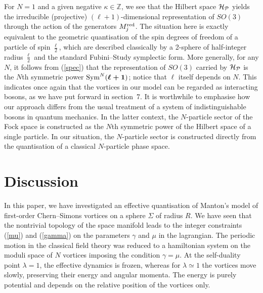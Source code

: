 \documentclass[a4paper,11pt]{article}
\begin{document}
For $N=1$ and a given negative $\kappa\in \mathbb{Z}$, we see that the
Hilbert space ${\cal H}_{\cal P}$ yields the irreducible (projective)
$(\ell+1)$-dimensional representation of $SO(3)$ through the action of
the generators $M_{j}^{\rm red}$. The situation here is exactly equivalent to
the geometric quantisation of the spin degrees of freedom of a
particle of spin $\frac{\ell}{2}$, which are described classically by
a 2-sphere of half-integer radius $\frac{\ell}{2}$ and the standard 
Fubini--Study symplectic form. More generally, for any $N$, it follows
from (\ref{spec}) that the representation of $SO(3)$ carried by 
${\cal H}_{\cal P}$ is the $N$th symmetric power 
${\rm Sym}^{N}(\boldsymbol{\ell+1})$; notice that $\ell$ itself
depends on $N$. This indicates once again that the vortices in our model
can be regarded as interacting bosons, as we have put forward in 
section~7. It is worthwhile to emphasise how our approach
differs from the usual treatment of a system of indistinguishable
bosons in quantum 
mechanics. In the latter context, the $N$-particle sector of the Fock 
space is constructed as the $N$th symmetric power of the
Hilbert space of a single particle. In our situation, the $N$-particle
sector is constructed directly from the quantisation of a classical
$N$-particle phase space.



\section{Discussion}


In this paper, we have investigated an effective quantisation of
Manton's model of first-order Chern--Simons vortices on a sphere 
$\Sigma$ of 
radius $R$. We have seen that the nontrivial topology of the space
manifold leads to the integer constraints (\ref{mu}) and (\ref{gamma})
on the parameters $\gamma$ and $\mu$ in the lagrangian.
The periodic motion in the classical field theory was reduced
to a hamiltonian system on the moduli space of $N$ vortices
imposing the condition $\gamma=\mu$. At the self-duality point 
$\lambda=1$, the effective dynamics is frozen, whereas for 
$\lambda\simeq 1$ the vortices move
slowly, preserving their energy and angular momenta. The energy is purely 
potential and depends on the relative position of the vortices only.
\end{document}

